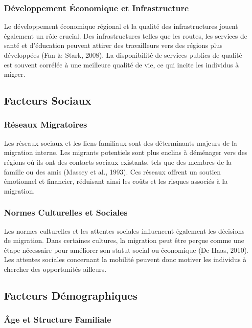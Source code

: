\documentclass[a4paper,12pt]{article}
\begin{document}
\subsubsection{Développement Économique et Infrastructure}


Le développement économique régional et la qualité des infrastructures jouent également un rôle crucial. Des infrastructures telles que les routes, les services de santé et d'éducation peuvent attirer des travailleurs vers des régions plus développées (Fan \& Stark, 2008). La disponibilité de services publics de qualité est souvent corrélée à une meilleure qualité de vie, ce qui incite les individus à migrer.

\subsection{Facteurs Sociaux}

\subsubsection{Réseaux Migratoires}

Les réseaux sociaux et les liens familiaux sont des déterminants majeurs de la migration interne. Les migrants potentiels sont plus enclins à déménager vers des régions où ils ont des contacts sociaux existants, tels que des membres de la famille ou des amis (Massey et al., 1993). Ces réseaux offrent un soutien émotionnel et financier, réduisant ainsi les coûts et les risques associés à la migration.

\subsubsection{Normes Culturelles et Sociales}

Les normes culturelles et les attentes sociales influencent également les décisions de migration. Dans certaines cultures, la migration peut être perçue comme une étape nécessaire pour améliorer son statut social ou économique (De Haas, 2010). Les attentes sociales concernant la mobilité peuvent donc motiver les individus à chercher des opportunités ailleurs.

\subsection{Facteurs Démographiques}

\subsubsection{Âge et Structure Familiale}
\end{document}
